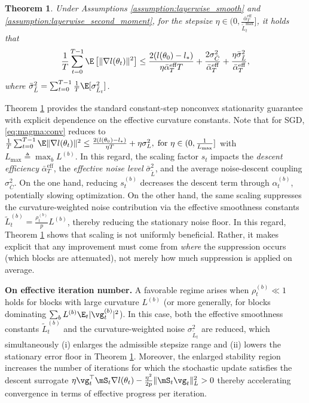 \documentclass[11pt, a4paper, twocolumn, copyright, goog]{google}
\theoremstyle{plain}
\newtheorem{theorem}{Theorem}
\theoremstyle{definition}
\theoremstyle{remark}
\begin{document}
\begin{theorem} \label{theorem:main_result}
    Under Assumptions \ref{assumption:layerwise_smooth} and \ref{assumption:layerwise_second_moment}, for the stepsize $\eta \in (0, \frac{\bar{\alpha}_{T}^{\textrm{eff}}}{ \tilde{L}_t^{\max} } ]$, it holds that 
    \begin{equation} \label{eq:magma:conv}
        \frac{1}{T} \sum_{t=0}^{T-1} \E \left[ \| \nabla l (\theta_t) \|^2 \right]
            \le \frac{2(l(\theta_0) - l_*) }{\eta \bar{\alpha}_{T}^{\textrm{eff}} T}
            +   \frac{2 \sigma^2_{\bar{C}}}{\bar{\alpha}_{T}^{\textrm{eff}}}  
            + \frac{\eta \bar{\sigma}^2_{\tilde{L}}}{ \bar{\alpha}_{T}^{\textrm{eff}}},
    \end{equation}
    where $ \bar{\sigma}^2_{\tilde{L}} = \sum_{t=0}^{T-1} \frac{1}{T} \E [\sigma^2_{\tilde{L}_t}]$. 
\end{theorem}


Theorem \ref{theorem:main_result} provides the standard constant-step nonconvex stationarity guarantee with explicit dependence on the effective curvature constants.
Note that for SGD, \eqref{eq:magma:conv} reduces to $\frac{1}{T} \sum_{t=0}^{T-1} \E \| \nabla l(\theta_t ) \|^2 \le \frac{2 (l(\theta_0) - l_*)}{\eta T} + \eta \sigma_L^2, \; \text{for } \eta \in (0, \frac{1}{L_{\max}}]$ with $L_{\max} \triangleq \max_b L^{(b)}$.
In this regard, the scaling factor $s_t$ impacts the \emph{descent efficiency} $\bar{\alpha}_T^{\mathrm{eff}}$, the \emph{effective noise level} $\bar{\sigma}^2_{\tilde{L}}$, and the average noise-descent coupling $\sigma^2_{\bar{C}}$.
On the one hand, reducing $s_t^{(b)}$ decreases the descent term through $\alpha_t^{(b)}$,
potentially slowing optimization.
On the other hand, the same scaling suppresses the curvature-weighted noise contribution via the effective smoothness constants $\tilde{L}_t^{(b)} = \frac{\rho_t^{(b)}}{p} L^{(b)}$, thereby reducing the stationary noise floor.
In this regard, Theorem \ref{theorem:main_result} shows that scaling is not uniformly beneficial. Rather, it makes explicit that any improvement must come from \textit{where} the suppression occurs (which blocks are attenuated), not merely how much suppression is applied on average.


\textbf{On effective iteration number.}
A favorable regime arises when $\rho_t^{(b)} \ll 1$ holds for blocks with large curvature $L^{(b)}$ (or more generally, for blocks dominating $\sum_b L^{(b)} \E_t |\vg_t^{(b)}|^2$).
In this case, both the effective smoothness constants $\tilde L_t^{(b)}$ and the curvature-weighted noise $\sigma^2_{\tilde L_t}$ are reduced, which simultaneously (i) enlarges the admissible stepsize range and (ii) lowers the stationary error floor in Theorem \ref{theorem:main_result}.
Moreover, the enlarged stability region increases the number of iterations for which the stochastic update satisfies the descent surrogate $\eta \vg_t^\top \mS_t\nabla l(\theta_t) - \frac{\eta^2}{2p}\|\mS_t \vg_t\|_L^2 > 0$ thereby accelerating convergence in terms of effective progress per iteration.
\end{document}
